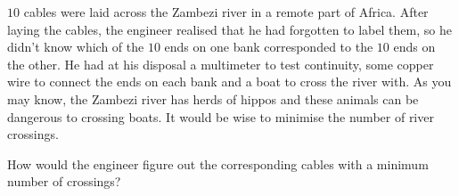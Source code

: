 \documentclass[12pt,answers]{exam}
\begin{document}
\begin{questions}
\question $10$ cables were laid across the Zambezi river in a remote part of Africa. After laying the cables, the engineer realised that he had forgotten to label them, so he didn't know which of the $10$ ends on one bank corresponded to the $10$ ends on the other. He had at his disposal a multimeter to test continuity, some copper wire to connect the ends on each bank and a boat to cross the river with.  As you may know, the Zambezi river has herds of hippos and these  animals can be dangerous to crossing boats. It would be wise to minimise the number of river crossings.

How would the engineer figure out the corresponding cables with a minimum number of crossings?
\end{questions}
\end{document}
